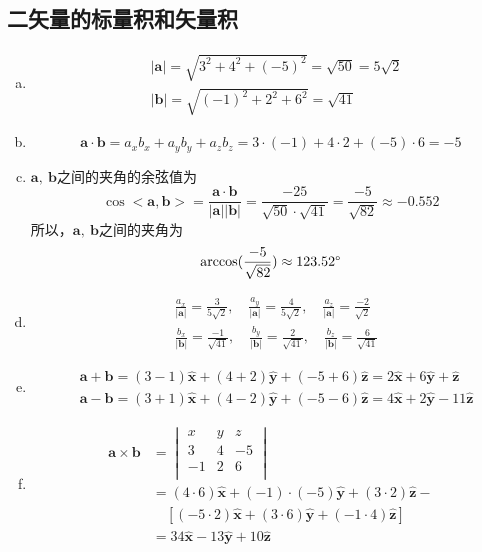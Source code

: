 \subsection{二矢量的标量积和矢量积}
\begin{enumerate}[(a)]
	\item
	\[
	\begin{aligned}
	&|\bm{a}| = \sqrt{3^2+4^2+(-5)^2} = \sqrt{50} = 5\sqrt{2} \\
	&|\bm{b}| = \sqrt{(-1)^2+2^2+6^2} = \sqrt{41}
	\end{aligned}
	\]
	\item
	\[
	\bm{a}\cdot\bm{b} = a_x b_x + a_y b_y + a_z b_z = 3 \cdot (-1) + 4 \cdot 2 + (-5) \cdot 6 =  -5
	\]
	\item
	$\bm{a},\ \bm{b}$之间的夹角的余弦值为
	\[
	\cos<\bm{a},\bm{b}> = \frac{\bm{a}\cdot\bm{b}}{|\bm{a}||\bm{b}|} = \frac{-25}{\sqrt{50} \cdot \sqrt{41}} = \frac{-5}{\sqrt{82}} \approx -0.552
	\]
	所以，$\bm{a},\ \bm{b}$之间的夹角为
	\[
	\arccos(\frac{-5}{\sqrt{82}}) \approx 123.52\degree
	\]
	\item
	\[
	\begin{aligned}
	&\frac{a_x}{|\bm{a}|} = \frac{3}{5\sqrt{2}},\quad \frac{a_y}{|\bm{a}|} = \frac{4}{5\sqrt{2}}, \quad
	\frac{a_z}{|\bm{a}|} = \frac{-2}{\sqrt{2}} \\
	&\frac{b_x}{|\bm{b}|} = \frac{-1}{\sqrt{41}}, \quad \frac{b_y}{|\bm{b}|} = \frac{2}{\sqrt{41}}, \quad
	\frac{b_z}{|\bm{b}|} = \frac{6}{\sqrt{41}}
	\end{aligned}
	\]
	\item
	\[
	\begin{aligned}
	&\bm{a} + \bm{b} = (3-1)\bm{\hat{x}} + (4+2)\bm{\hat{y}} + (-5+6)\bm{\hat{z}} = 2\bm{\hat{x}} + 6\bm{\hat{y}} + \bm{\hat{z}} \\
	&\bm{a} - \bm{b} = (3+1)\bm{\hat{x}} + (4-2)\bm{\hat{y}} + (-5-6)\bm{\hat{z}} = 4\bm{\hat{x}} + 2\bm{\hat{y}} -11\bm{\hat{z}}
	\end{aligned}
	\]	
	\item
	\[
	\begin{aligned}
	\bm{a} \times \bm{b}
	& =
	\begin{vmatrix}
		 x & y & z \\
 		3 & 4 & -5 \\
 		-1 & 2 & 6 \\
 	\end{vmatrix} \\
	& = (4 \cdot 6)\bm{\hat{x}} + (-1) \cdot(-5)\bm{\hat{y}} + (3 \cdot 2)\bm{\hat{z}} - \\
	&\quad [(-5 \cdot 2)\bm{\hat{x}} + (3 \cdot 6)\bm{\hat{y}} + (-1 \cdot 4)\bm{\hat{z}}] \\
	& = 34\bm{\hat{x}} - 13\bm{\hat{y}} + 10\bm{\hat{z}}
	\end{aligned}
	\]
\end{enumerate}
